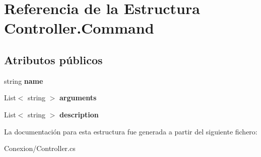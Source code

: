 \hypertarget{struct_controller_1_1_command}{}\section{Referencia de la Estructura Controller.\+Command}
\label{struct_controller_1_1_command}
\subsection*{Atributos públicos}
\begin{DoxyCompactItemize}
\item 
\mbox{\label{struct_controller_1_1_command_ab14a31d99566fa1d589e5a76c36c84a1}} 
string {\bfseries name}
\item 
\mbox{\label{struct_controller_1_1_command_a7bb3362d175104aa5ba0227f680559e2}} 
List$<$ string $>$ {\bfseries arguments}
\item 
\mbox{\label{struct_controller_1_1_command_a266d40030629c71cecca42f209e9e363}} 
List$<$ string $>$ {\bfseries description}
\end{DoxyCompactItemize}


La documentación para esta estructura fue generada a partir del siguiente fichero\+:\begin{DoxyCompactItemize}
\item 
Conexion/Controller.\+cs\end{DoxyCompactItemize}

